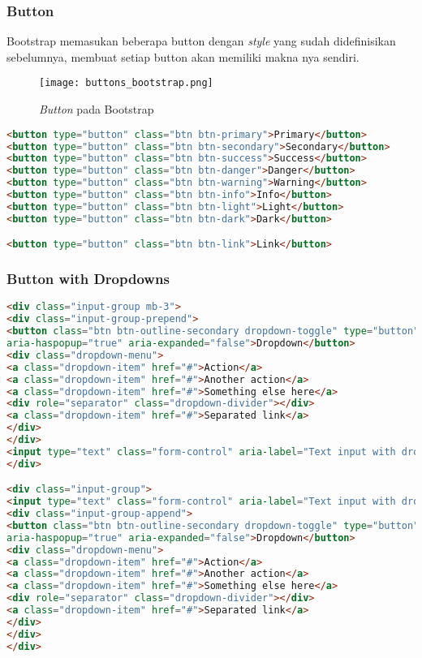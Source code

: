 \subsubsection{Button}
Bootstrap memasukan beberapa button dengan \textit{style} yang sudah didefinisikan sebelumnya, membuat setiap button akan memiliki makna nya sendiri.
\begin{figure} [H]
	\centering  
	\texttt{[image: buttons\_bootstrap.png]}  
	\caption{\textit{Button} pada Bootstrap} 
	\label{fig:buttonBootstrap}
\end{figure}
\begin{lstlisting}[language=HTML,  basicstyle=\ttfamily, frame=single, columns=fullflexible, keepspaces=true, breaklines=true, showstringspaces=false, label={lst:buttonBootstrap}, caption=Button pada bootstrap 4.] 
<button type="button" class="btn btn-primary">Primary</button>
<button type="button" class="btn btn-secondary">Secondary</button>
<button type="button" class="btn btn-success">Success</button>
<button type="button" class="btn btn-danger">Danger</button>
<button type="button" class="btn btn-warning">Warning</button>
<button type="button" class="btn btn-info">Info</button>
<button type="button" class="btn btn-light">Light</button>
<button type="button" class="btn btn-dark">Dark</button>

<button type="button" class="btn btn-link">Link</button>
\end{lstlisting}


\subsubsection{Button with Dropdowns}
\begin{lstlisting}[language=HTML,  basicstyle=\ttfamily, frame=single, columns=fullflexible, keepspaces=true, breaklines=true, showstringspaces=false, label={lst:buttonDropdownBootstrap}, caption=Button dropdown pada bootstrap 4.] 
<div class="input-group mb-3">
<div class="input-group-prepend">
<button class="btn btn-outline-secondary dropdown-toggle" type="button" data-toggle="dropdown"
aria-haspopup="true" aria-expanded="false">Dropdown</button>
<div class="dropdown-menu">
<a class="dropdown-item" href="#">Action</a>
<a class="dropdown-item" href="#">Another action</a>
<a class="dropdown-item" href="#">Something else here</a>
<div role="separator" class="dropdown-divider"></div>
<a class="dropdown-item" href="#">Separated link</a>
</div>
</div>
<input type="text" class="form-control" aria-label="Text input with dropdown button">
</div>

<div class="input-group">
<input type="text" class="form-control" aria-label="Text input with dropdown button">
<div class="input-group-append">
<button class="btn btn-outline-secondary dropdown-toggle" type="button" data-toggle="dropdown"
aria-haspopup="true" aria-expanded="false">Dropdown</button>
<div class="dropdown-menu">
<a class="dropdown-item" href="#">Action</a>
<a class="dropdown-item" href="#">Another action</a>
<a class="dropdown-item" href="#">Something else here</a>
<div role="separator" class="dropdown-divider"></div>
<a class="dropdown-item" href="#">Separated link</a>
</div>
</div>
</div>
\end{lstlisting}


